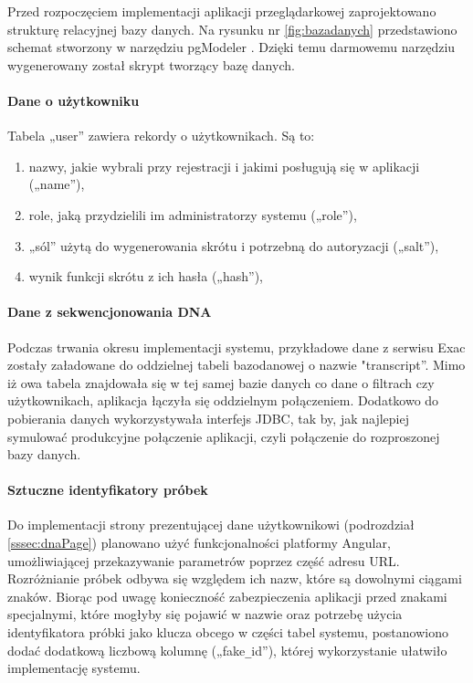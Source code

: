 \documentclass[a4paper,12pt,twoside]{article}
\begin{document}
\restoregeometry
\newpage

Przed rozpoczęciem implementacji aplikacji przeglądarkowej zaprojektowano strukturę
relacyjnej bazy danych. Na rysunku nr \ref{fig:bazadanych} przedstawiono schemat stworzony
w narzędziu pgModeler \cite{pgModeler}. Dzięki temu darmowemu narzędziu wygenerowany został
skrypt tworzący bazę danych.
\paragraph{Dane o użytkowniku} Tabela „user” zawiera rekordy o użytkownikach.
Są to:
\begin{enumerate}[1)]
\item nazwy, jakie wybrali przy rejestracji i jakimi posługują się w aplikacji („name”),
\item role, jaką przydzielili im administratorzy systemu („role”),
\item „sól” użytą do wygenerowania skrótu i potrzebną do autoryzacji („salt”),
\item wynik funkcji skrótu z ich hasła („hash”),
\end{enumerate}

\paragraph{Dane z sekwencjonowania DNA} Podczas trwania okresu implementacji systemu,
przykładowe dane z serwisu Exac zostały załadowane do oddzielnej tabeli bazodanowej o nazwie "transcript”. Mimo iż owa tabela znajdowała się w tej samej bazie danych co
dane o filtrach czy użytkownikach, aplikacja łączyła się oddzielnym połączeniem.
Dodatkowo do pobierania danych wykorzystywała interfejs JDBC, tak by, jak najlepiej
symulować produkcyjne połączenie aplikacji, czyli połączenie do rozproszonej bazy danych.

\paragraph{Sztuczne identyfikatory próbek} Do implementacji strony
prezentującej dane użytkownikowi (podrozdział \ref{sssec:dnaPage}) planowano użyć
funkcjonalności platformy Angular, umożliwiającej przekazywanie parametrów
poprzez część adresu URL. Rozróżnianie próbek odbywa się względem ich nazw, które
są dowolnymi ciągami znaków. Biorąc pod uwagę konieczność zabezpieczenia aplikacji przed
znakami specjalnymi, które mogłyby się pojawić w nazwie oraz potrzebę
użycia identyfikatora próbki jako klucza obcego w części tabel systemu, postanowiono
dodać dodatkową liczbową kolumnę („fake\verb!_!id”), której wykorzystanie ułatwiło implementację systemu.
\end{document}
